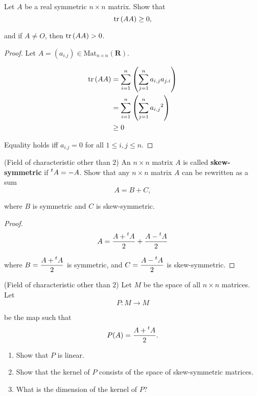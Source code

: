 \begin{exercise}
    Let $A$ be a real symmetric $n\times n$ matrix. Show that
    \[
        \text{tr}\left({AA}\right) \geq 0,
    \]

    and if $A\ne O$, then $\text{tr}\left({AA}\right) > 0$.
\end{exercise}

\begin{proof}
    Let $A = {(a_{i.j})} \in \text{Mat}_{n\times n}(\mathbf{R})$.

    \begin{align*}
        \text{tr}\left({AA}\right) & = \sum^{n}_{i=1}\left( \sum^{n}_{j=1} a_{i.j}a_{j.i} \right) \\
                & = \sum^{n}_{i=1}\left( \sum^{n}_{j=1} {a_{i.j}}^{2} \right)  \\
                & \geq 0
    \end{align*}

    Equality holds iff $a_{i.j} = 0$ for all $1\leq i, j \leq n$.
\end{proof}

\begin{exercise}
    (Field of characteristic other than $2$) An $n\times n$ matrix $A$ is called \textbf{skew-symmetric} if $\prescript{t}{}{A} = -A$. Show that any $n\times n$ matrix $A$ can be rewritten as a sum
    \[
        A = B + C,
    \]

    where $B$ is symmetric and $C$ is skew-symmetric.
\end{exercise}

\begin{proof}
    \[
        A = \frac{A + \prescript{t}{}{A}}{2} + \frac{A - \prescript{t}{}{A}}{2}
    \]

    where $B = \dfrac{A + \prescript{t}{}{A}}{2}$ is symmetric, and $C = \dfrac{A - \prescript{t}{}{A}}{2}$ is skew-symmetric.
\end{proof}

\begin{exercise}
    (Field of characteristic other than $2$) Let $M$ be the space of all $n\times n$ matrices. Let
    \[
        P: M \to M
    \]

    be the map such that
    \[
        P(A) = \frac{A + \prescript{t}{}{A}}{2}.
    \]

    \begin{enumerate}[label={(\alph*)}]
        \item Show that $P$ is linear.
        \item Show that the kernel of $P$ consists of the space of skew-symmetric matrices.
        \item What is the dimension of the kernel of $P$?
    \end{enumerate}
\end{exercise}


